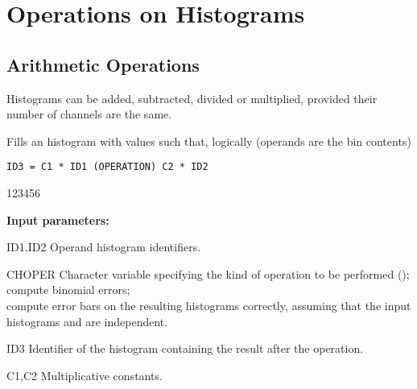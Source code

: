  
\chapter{Operations on Histograms}
\label{HOPERFIT}

\section{Arithmetic Operations}
\label{HARITHME}

Histograms can be added, subtracted, divided or multiplied, provided
their number of channels are the same.
 
 
\Action
Fills an histogram  with values such that,
logically (operands are the bin contents)
 
\begin{verbatim}
ID3 = C1 * ID1 (OPERATION) C2 * ID2
\end{verbatim}
 
\begin{DLtt}{123456}
\item[{\rm\bf Input parameters:}]
\item[ID1,ID2] Operand histogram identifiers.
\item[CHOPER] Character variable specifying the
     kind of operation to be performed
     (\Lit{+,-,*,/});\\
      compute binomial errors;\\
      compute error bars on the resulting
      histograms correctly, assuming that the
      input histograms  and  are independent.
\item[ID3] Identifier of the histogram containing
the result after the operation.
\item[C1,C2] Multiplicative constants.
\end{DLtt}
 
